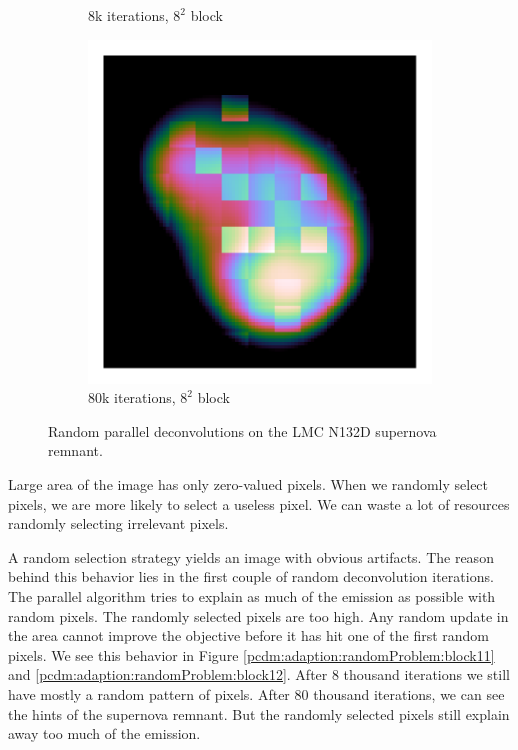 \begin{figure}[h]
\begin{subfigure}[b]{0.245\linewidth}
		\caption{8k iterations, $8^2$ block}
		\label{pcdm:adaption:randomProblem:block81}
	\end{subfigure}
		\begin{subfigure}[b]{0.2405\linewidth}
		\includegraphics[width=1.00\linewidth, clip, trim= 0.25in 0.25in 0.25in 0.25in]{./chapters/05.pcdm/randomProblem/random_10k_block8.png}
		\caption{80k iterations, $8^2$ block}
		\label{pcdm:adaption:randomProblem:block82}
	\end{subfigure}
	\caption{Random parallel deconvolutions on the LMC N132D supernova remnant.}
	\label{pcdm:adaption:randomProblem}
\end{figure}

Large area of the image has only zero-valued pixels. When we randomly select pixels, we are more likely to select a useless pixel. We can waste a lot of resources randomly selecting irrelevant pixels. 


A random selection strategy yields an image with obvious artifacts. The reason behind this behavior lies in the first couple of random deconvolution iterations. The parallel algorithm tries to explain as much of the emission as possible with random pixels. The randomly selected pixels are too high. Any random update in the area cannot improve the objective before it has hit one of the first random pixels. We see this behavior in Figure \ref{pcdm:adaption:randomProblem:block11} and \ref{pcdm:adaption:randomProblem:block12}. After 8 thousand iterations we still have mostly a random pattern of pixels. After 80 thousand iterations, we can see the hints of the supernova remnant. But the randomly selected pixels still explain away too much of the emission.

